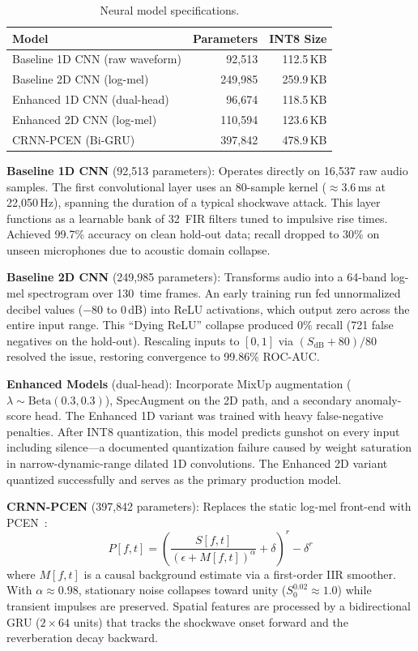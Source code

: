 \documentclass[conference]{IEEEtran}
\begin{document}
\begin{table}[!t]
\centering
\caption{Neural model specifications.}
\label{tab:models}
\footnotesize
\begin{tabular}{lrr}
\toprule
\textbf{Model} & \textbf{Parameters} & \textbf{INT8 Size} \\
\midrule
Baseline 1D CNN (raw waveform) & 92{,}513 & 112.5\,KB \\
Baseline 2D CNN (log-mel) & 249{,}985 & 259.9\,KB \\
Enhanced 1D CNN (dual-head) & 96{,}674 & 118.5\,KB \\
Enhanced 2D CNN (log-mel) & 110{,}594 & 123.6\,KB \\
CRNN-PCEN (Bi-GRU) & 397{,}842 & 478.9\,KB \\
\bottomrule
\end{tabular}
\end{table}

\textbf{Baseline 1D CNN} (92{,}513 parameters): Operates directly on 16{,}537 raw audio samples. The first convolutional layer uses an 80-sample kernel ($\approx$3.6\,ms at 22{,}050\,Hz), spanning the duration of a typical shockwave attack. This layer functions as a learnable bank of 32~FIR filters tuned to impulsive rise times. Achieved 99.7\% accuracy on clean hold-out data; recall dropped to 30\% on unseen microphones due to acoustic domain collapse.

\textbf{Baseline 2D CNN} (249{,}985 parameters): Transforms audio into a 64-band log-mel spectrogram over 130~time frames. An early training run fed unnormalized decibel values ($-80$ to $0$\,dB) into ReLU activations, which output zero across the entire input range. This ``Dying ReLU'' collapse produced 0\% recall (721 false negatives on the hold-out). Rescaling inputs to $[0,1]$ via $(S_{\mathrm{dB}}+80)/80$ resolved the issue, restoring convergence to 99.86\% ROC-AUC.

\textbf{Enhanced Models} (dual-head): Incorporate MixUp augmentation ($\lambda \sim \mathrm{Beta}(0.3, 0.3)$), SpecAugment on the 2D path, and a secondary anomaly-score head. The Enhanced 1D variant was trained with heavy false-negative penalties. After INT8 quantization, this model predicts gunshot on every input including silence---a documented quantization failure caused by weight saturation in narrow-dynamic-range dilated 1D convolutions. The Enhanced 2D variant quantized successfully and serves as the primary production model.

\textbf{CRNN-PCEN} (397{,}842 parameters): Replaces the static log-mel front-end with PCEN~\cite{lostanlen2019}:
\begin{equation}
P[f,t] = \left( \frac{S[f,t]}{(\epsilon + M[f,t])^{\alpha}} + \delta \right)^{r} - \delta^{r}
\label{eq:pcen}
\end{equation}
where $M[f,t]$ is a causal background estimate via a first-order IIR smoother. With $\alpha \approx 0.98$, stationary noise collapses toward unity ($S_0^{0.02} \approx 1.0$) while transient impulses are preserved. Spatial features are processed by a bidirectional GRU ($2 \times 64$ units) that tracks the shockwave onset forward and the reverberation decay backward.
\end{document}
